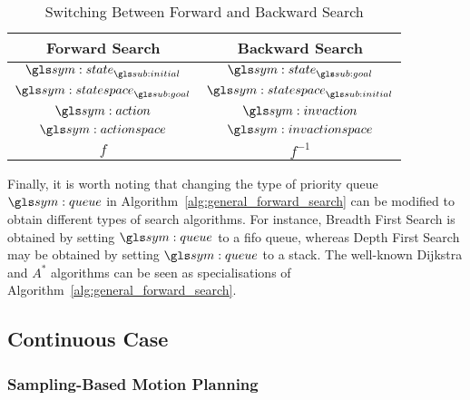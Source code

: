 
		\begin{table}[ht]
			\centering
			\begin{tabular}{c  c}
				\toprule
				Forward Search 			& Backward Search\\
				\midrule
				$\state_{\initial}$		&	$\state_{\goal}$ 			\\
				$\statespace_{\goal}$	&	$\statespace_{\initial}$	\\
				$\action$ 				&	$\invaction$				\\
				$\actionspace$ 			&	$\invactionspace$			\\
				$f$ 					&	$f^{-1}$					\\
			\end{tabular}
			\caption{Switching Between Forward and Backward Search}%
			\label{tab:switiching_between_forward_and_backward_search}
		\end{table}


		Finally, it is worth noting that changing the type of priority queue
		$\queue$ in Algorithm~\ref{alg:general_forward_search} can be modified
		to obtain different types of search algorithms. For instance, Breadth
		First Search is obtained by setting $\queue$ to a \gls{fifo} queue, whereas
		Depth First Search may be obtained by setting $\queue$ to a
		stack. The
		well-known Dijkstra and $A^*$ algorithms can be seen as specialisations
		of Algorithm~\ref{alg:general_forward_search}.


	\subsection{Continuous Case}%
	\label{sec:continuous_case}

		\subsubsection{Sampling-Based Motion Planning}%
		\label{sec:sampling_based_motion_planning}

